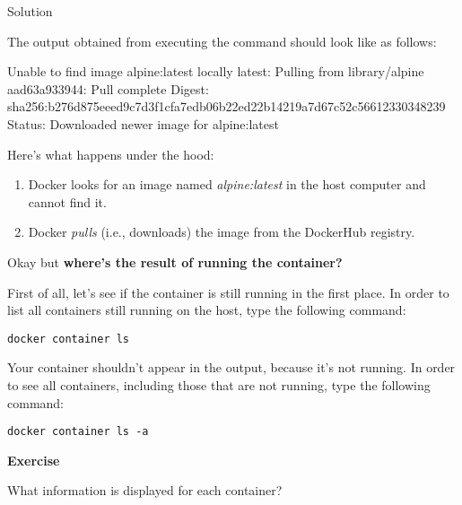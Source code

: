 \documentclass[
]{article}
\newenvironment{Shaded}{\begin{snugshade}}{\end{snugshade}}
\newcommand{\ExtensionTok}[1]{#1}
\newcommand{\NormalTok}[1]{#1}
\newcommand{\StringTok}[1]{\textcolor[rgb]{0.31,0.60,0.02}{#1}}
\newenvironment{infobox}[1]
  {
  \begin{itemize}
  \renewcommand{\labelitemi}{
    \raisebox{-.7\height}[0pt][0pt]{
      
    }
  }
  \setlength{\fboxsep}{1em}
  \begin{whitebox}
  \item
  }
  {
  \end{whitebox}
  \end{itemize}
  }
\theoremstyle{definition}
\theoremstyle{definition}
\theoremstyle{definition}
\theoremstyle{remark}
\let\BeginKnitrBlock\begin \let\EndKnitrBlock\end
\begin{document}
Solution

\begin{infobox}{exercisebox}

The output obtained from executing the command should
look like as follows:

\begin{Shaded}
\begin{Highlighting}[]
\ExtensionTok{Unable}\NormalTok{ to find image }\StringTok{\textquotesingle{}alpine:latest\textquotesingle{}}\NormalTok{ locally}
\ExtensionTok{latest}\NormalTok{: Pulling from library/alpine}
\ExtensionTok{aad63a933944}\NormalTok{: Pull complete }
\ExtensionTok{Digest}\NormalTok{: sha256:b276d875eeed9c7d3f1cfa7edb06b22ed22b14219a7d67c52c56612330348239}
\ExtensionTok{Status}\NormalTok{: Downloaded newer image for alpine:latest}
\end{Highlighting}
\end{Shaded}

Here's what happens under the hood:

\begin{enumerate}
\def\labelenumi{\arabic{enumi}.}
\item
  Docker looks for an image named \emph{alpine:latest} in the host
  computer and cannot find it.
\item
  Docker \emph{pulls} (i.e., downloads) the image from the DockerHub registry.
\end{enumerate}

\end{infobox}

Okay but \textbf{where's the result of running the container?}

First of all, let's see if the container is still running in the first
place.
In order to list all containers still running on the host, type the
following command:

\begin{verbatim}
docker container ls 
\end{verbatim}

Your container shouldn't appear in the output,
because it's not running.
In order to see all containers, including those that are not
running, type the following command:

\begin{verbatim}
docker container ls -a
\end{verbatim}

\begin{infobox}{exercisebox}

\textbf{Exercise}

\BeginKnitrBlock{exercise}
\protect\hypertarget{exr:unnamed-chunk-5}{}{\label{exr:unnamed-chunk-5} }What information is displayed for each container?
\EndKnitrBlock{exercise}

\end{infobox}
\end{document}
